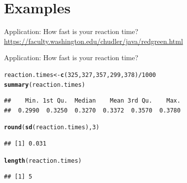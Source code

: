 \documentclass[10pt]{beamer}\usepackage[]{graphicx}\usepackage[]{color}
\makeatletter
\newcommand{\hlnum}[1]{\textcolor[rgb]{0.686,0.059,0.569}{#1}}%
\newcommand{\hlopt}[1]{\textcolor[rgb]{0,0,0}{#1}}%
\newcommand{\hlstd}[1]{\textcolor[rgb]{0.345,0.345,0.345}{#1}}%
\newcommand{\hlkwb}[1]{\textcolor[rgb]{0.69,0.353,0.396}{#1}}%
\newcommand{\hlkwd}[1]{\textcolor[rgb]{0.737,0.353,0.396}{\textbf{#1}}}%
\newenvironment{kframe}{%
 \def\at@end@of@kframe{}%
 \ifinner\ifhmode%
  \def\at@end@of@kframe{\end{minipage}}%
  \begin{minipage}{\columnwidth}%
 \fi\fi%
 \def\FrameCommand##1{\hskip\@totalleftmargin \hskip-\fboxsep
 \colorbox{shadecolor}{##1}\hskip-\fboxsep
     \hskip-\linewidth \hskip-\@totalleftmargin \hskip\columnwidth}%
 \MakeFramed {\advance\hsize-\width
   \@totalleftmargin\z@ \linewidth\hsize
   \@setminipage}}%
 {\par\unskip\endMakeFramed%
 \at@end@of@kframe}
\newenvironment{knitrout}{}{} %
\makeatother
\begin{document}
\section{Examples}


\begin{frame}{Application: How fast is your reaction time?}
	\small\url{https://faculty.washington.edu/chudler/java/redgreen.html} 
	
	
\end{frame}


\begin{frame}[fragile]{Application: How fast is your reaction time?}
\begin{knitrout}\tiny
{}\color{fgcolor}\begin{kframe}
\begin{alltt}
\hlstd{reaction.times} \hlkwb{<-} \hlkwd{c}\hlstd{(}\hlnum{325}\hlstd{,}\hlnum{327}\hlstd{,}\hlnum{357}\hlstd{,}\hlnum{299}\hlstd{,}\hlnum{378}\hlstd{)}\hlopt{/}\hlnum{1000}
\hlkwd{summary}\hlstd{(reaction.times)}
\end{alltt}
\begin{verbatim}
##    Min. 1st Qu.  Median    Mean 3rd Qu.    Max. 
##  0.2990  0.3250  0.3270  0.3372  0.3570  0.3780
\end{verbatim}
\begin{alltt}
\hlkwd{round}\hlstd{(}\hlkwd{sd}\hlstd{(reaction.times),}\hlnum{3}\hlstd{)}
\end{alltt}
\begin{verbatim}
## [1] 0.031
\end{verbatim}
\begin{alltt}
\hlkwd{length}\hlstd{(reaction.times)}
\end{alltt}
\begin{verbatim}
## [1] 5
\end{verbatim}
\end{kframe}
\end{knitrout}
	
\end{frame}
\end{document}

